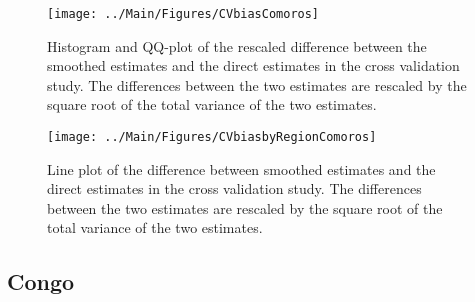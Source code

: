 \documentclass[12pt]{article}\usepackage[]{graphicx}\usepackage[]{color}
\newenvironment{knitrout}{}{} %
\begin{document}
\begin{knitrout}
\color{fgcolor}\begin{figure}[bht]

{\centering \texttt{[image: ../Main/Figures/CVbiasComoros]} 

}

\caption[Histogram and QQ-plot of the rescaled difference between the smoothed estimates and the direct estimates in the cross validation study]{Histogram and QQ-plot of the rescaled difference between the smoothed estimates and the direct estimates in the cross validation study. The differences between the two estimates are rescaled by the square root of the total variance of the two estimates.}\label{fig:unnamed-chunk-69}
\end{figure}


\end{knitrout}

\begin{knitrout}
\color{fgcolor}\begin{figure}[bht]

{\centering \texttt{[image: ../Main/Figures/CVbiasbyRegionComoros]} 

}

\caption[Line plot of the difference between smoothed estimates and the direct estimates in the cross validation study]{Line plot of the difference between smoothed estimates and the direct estimates in the cross validation study. The differences between the two estimates are rescaled by the square root of the total variance of the two estimates.}\label{fig:unnamed-chunk-70}
\end{figure}


\end{knitrout}

\clearpage
\subsection{Congo}


\end{document}
